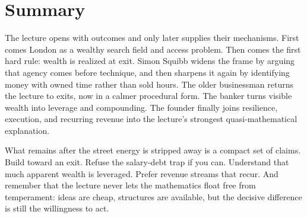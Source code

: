 \section{Summary}

The lecture opens with outcomes and only later supplies their mechanisms. First comes London as a wealthy search field and access problem. Then comes the first hard rule: wealth is realized at exit. Simon Squibb widens the frame by arguing that agency comes before technique, and then sharpens it again by identifying money with owned time rather than sold hours. The older businessman returns the lecture to exits, now in a calmer procedural form. The banker turns visible wealth into leverage and compounding. The founder finally joins resilience, execution, and recurring revenue into the lecture's strongest quasi-mathematical explanation.

What remains after the street energy is stripped away is a compact set of claims. Build toward an exit. Refuse the salary-debt trap if you can. Understand that much apparent wealth is leveraged. Prefer revenue streams that recur. And remember that the lecture never lets the mathematics float free from temperament: ideas are cheap, structures are available, but the decisive difference is still the willingness to act.